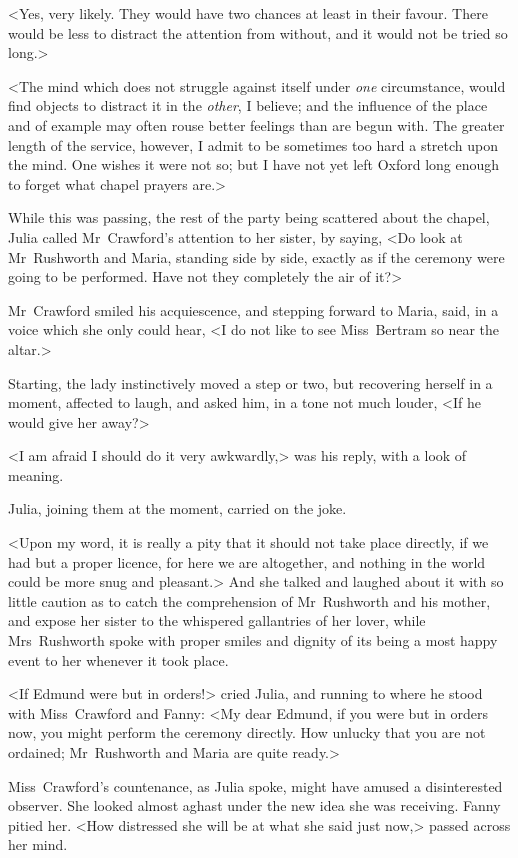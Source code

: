 <Yes, very likely. They would have two chances at least in their favour. There would be less to distract the attention from without, and it would not be tried so long.>

<The mind which does not struggle against itself under \textit{one}  circumstance, would find objects to distract it in the \textit{other}, I believe; and the influence of the place and of example may often rouse better feelings than are begun with. The greater length of the service, however, I admit to be sometimes too hard a stretch upon the mind. One wishes it were not so; but I have not yet left Oxford long enough to forget what chapel prayers are.>

While this was passing, the rest of the party being scattered about the chapel, Julia called Mr~Crawford's attention to her sister, by saying, <Do look at Mr~Rushworth and Maria, standing side by side, exactly as if the ceremony were going to be performed. Have not they completely the air of it?>

Mr~Crawford smiled his acquiescence, and stepping forward to Maria, said, in a voice which she only could hear, <I do not like to see Miss~Bertram so near the altar.>

Starting, the lady instinctively moved a step or two, but recovering herself in a moment, affected to laugh, and asked him, in a tone not much louder, <If he would give her away?>

<I am afraid I should do it very awkwardly,> was his reply, with a look of meaning.

Julia, joining them at the moment, carried on the joke.

<Upon my word, it is really a pity that it should not take place directly, if we had but a proper licence, for here we are altogether, and nothing in the world could be more snug and pleasant.> And she talked and laughed about it with so little caution as to catch the comprehension of Mr~Rushworth and his mother, and expose her sister to the whispered gallantries of her lover, while Mrs~Rushworth spoke with proper smiles and dignity of its being a most happy event to her whenever it took place.

<If Edmund were but in orders!> cried Julia, and running to where he stood with Miss~Crawford and Fanny: <My dear Edmund, if you were but in orders now, you might perform the ceremony directly. How unlucky that you are not ordained; Mr~Rushworth and Maria are quite ready.>

Miss~Crawford's countenance, as Julia spoke, might have amused a disinterested observer. She looked almost aghast under the new idea she was receiving. Fanny pitied her. <How distressed she will be at what she said just now,> passed across her mind.

